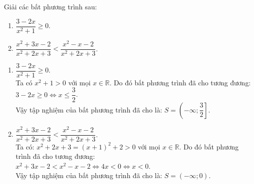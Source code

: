 \begin{vd}%
	Giải các bất phương trình sau:
	\begin{multicols}{2}
		\begin{enumerate}
			\item $\dfrac{3-2x}{x^2+1} \geq 0$.
			\item $\dfrac{x^2 + 3x - 2}{x^2 + 2x + 3} < \dfrac{x^2 - x - 2}{x^2 + 2x + 3}$.
		\end{enumerate}
	\end{multicols}
	\loigiai
	{
		\begin{enumerate}
			\item $\dfrac{3-2x}{x^2+1} \geq 0$.\\
			Ta có $x^2 + 1 >0$ với mọi $x \in \mathbb{R}$. Do đó bất phương trình đã cho tương đương:\\
			$3-2x \geq 0 \Leftrightarrow x \leq \dfrac{3}{2}$.\\
			Vậy tập nghiệm của bất phương trình đã cho là: $S = \left( -\infty; \dfrac{3}{2} \right]$.
			\item $\dfrac{x^2 + 3x - 2}{x^2 + 2x + 3} < \dfrac{x^2 - x - 2}{x^2 + 2x + 3}$.\\
			Ta có: $x^2 + 2x +3 =(x+1)^2 + 2 >0$ với mọi $x \in \mathbb{R}$. Do đó bất phương trình đã cho tương đương:\\
			$x^2 + 3x - 2 < x^2 - x - 2 \Leftrightarrow 4x < 0 \Leftrightarrow x<0$.\\
			Vậy tập nghiệm của bất phương trình đã cho là: $S = \left( -\infty; 0 \right)$.
		\end{enumerate}
	}
\end{vd}


